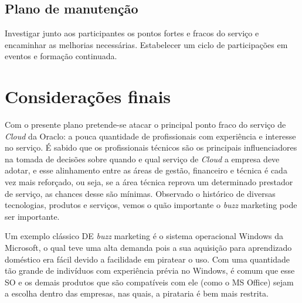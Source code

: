 \documentclass[a4paper]{article}
\begin{document}
\subsection{Plano de manutenção}

Investigar junto aos participantes os pontos fortes e fracos do serviço e encaminhar as melhorias necessárias. Estabelecer um ciclo de participações em eventos e formação continuada.

\section{Considerações finais}

Com o presente plano pretende-se atacar o principal ponto fraco do serviço de \emph{Cloud} da Oraclo: a pouca quantidade de profissionais com experiência e interesse no serviço. É sabido que os profissionais técnicos são os principais influenciadores na tomada de decisões sobre quando e qual serviço de \emph{Cloud} a empresa deve adotar, e esse alinhamento entre as áreas de gestão, financeiro e técnica é cada vez mais reforçado, ou seja, se a área técnica reprova um determinado prestador de serviço, as chances desse são mínimas. Observado o histórico de diversas tecnologias, produtos e serviços, vemos o quão importante o \emph{buzz} marketing pode ser importante.

Um exemplo clássico DE \emph{buzz} marketing é o sistema operacional Windows da Microsoft, o qual teve uma alta demanda pois a sua aquisição para aprendizado doméstico era fácil devido a facilidade em piratear o uso. Com uma quantidade tão grande de indivíduos com experiência prévia no Windows, é comum que esse SO e os demais produtos que são compatíveis com ele (como o MS Office) sejam a escolha dentro das empresas, nas quais, a pirataria é bem mais restrita.




\end{document}
